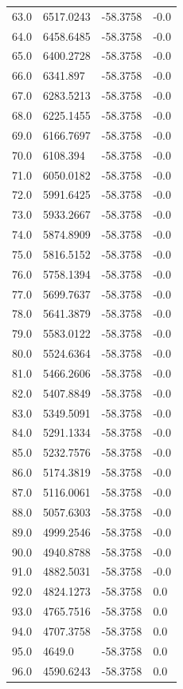 \begin{table}[H]
\begin{tabular}{llll}
63.0 & 6517.0243 & -58.3758 & -0.0 \\
64.0 & 6458.6485 & -58.3758 & -0.0 \\
65.0 & 6400.2728 & -58.3758 & -0.0 \\
66.0 & 6341.897 & -58.3758 & -0.0 \\
67.0 & 6283.5213 & -58.3758 & -0.0 \\
68.0 & 6225.1455 & -58.3758 & -0.0 \\
69.0 & 6166.7697 & -58.3758 & -0.0 \\
70.0 & 6108.394 & -58.3758 & -0.0 \\
71.0 & 6050.0182 & -58.3758 & -0.0 \\
72.0 & 5991.6425 & -58.3758 & -0.0 \\
73.0 & 5933.2667 & -58.3758 & -0.0 \\
74.0 & 5874.8909 & -58.3758 & -0.0 \\
75.0 & 5816.5152 & -58.3758 & -0.0 \\
76.0 & 5758.1394 & -58.3758 & -0.0 \\
77.0 & 5699.7637 & -58.3758 & -0.0 \\
78.0 & 5641.3879 & -58.3758 & -0.0 \\
79.0 & 5583.0122 & -58.3758 & -0.0 \\
80.0 & 5524.6364 & -58.3758 & -0.0 \\
81.0 & 5466.2606 & -58.3758 & -0.0 \\
82.0 & 5407.8849 & -58.3758 & -0.0 \\
83.0 & 5349.5091 & -58.3758 & -0.0 \\
84.0 & 5291.1334 & -58.3758 & -0.0 \\
85.0 & 5232.7576 & -58.3758 & -0.0 \\
86.0 & 5174.3819 & -58.3758 & -0.0 \\
87.0 & 5116.0061 & -58.3758 & -0.0 \\
88.0 & 5057.6303 & -58.3758 & -0.0 \\
89.0 & 4999.2546 & -58.3758 & -0.0 \\
90.0 & 4940.8788 & -58.3758 & -0.0 \\
91.0 & 4882.5031 & -58.3758 & -0.0 \\
92.0 & 4824.1273 & -58.3758 & 0.0 \\
93.0 & 4765.7516 & -58.3758 & 0.0 \\
94.0 & 4707.3758 & -58.3758 & 0.0 \\
95.0 & 4649.0 & -58.3758 & 0.0 \\
96.0 & 4590.6243 & -58.3758 & 0.0 \\

\end{tabular}
\end{table}
